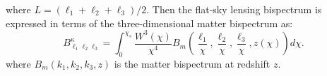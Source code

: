 where $L = (\ell_1 + \ell_2 + \ell_3) / 2$. Then the flat-sky lensing bispectrum is expressed in terms of the three-dimensional matter bispectrum as:
\begin{equation}
    B^\kappa_{\ell_1 \ell_2 \ell_3} = \int_0^{\chi_s} \frac{W^3(\chi)}{\chi^4} B_m\left( \frac{\ell_1}{\chi}, \frac{\ell_2}{\chi}, \frac{\ell_3}{\chi}, z(\chi) \right) d\chi.
\end{equation}
where $B_m(k_1, k_2, k_3, z)$ is the matter bispectrum at redshift $z$.

